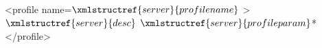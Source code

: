 <profile name=$\xmlstructref{server}{profilename}$ >
  $\xmlstructref{server}{desc}$
  $\xmlstructref{server}{profileparam}$*
</profile>
